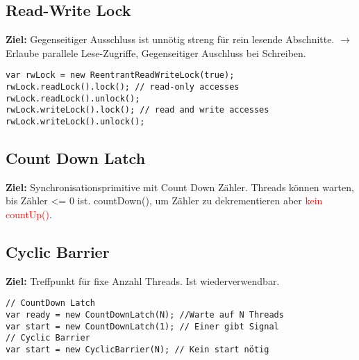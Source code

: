 \subsection{Read-Write Lock}
\textcolor{b}{\textbf{Ziel:}} Gegenseitiger Ausschluss ist unnötig streng für rein
lesende Abschnitte. $\rightarrow$ Erlaube parallele Lese-Zugriffe, Gegenseitiger Auschluss bei Schreiben.
\begin{lstlisting}
var rwLock = new ReentrantReadWriteLock(true);
rwLock.readLock().lock(); // read-only accesses
rwLock.readLock().unlock();
rwLock.writeLock().lock(); // read and write accesses
rwLock.writeLock().unlock();
\end{lstlisting}
\subsection{Count Down Latch}
\textcolor{b}{\textbf{Ziel:}} Synchronisationsprimitive mit Count Down Zähler. Threads können warten, bis Zähler <= 0 ist. \textcolor{b}{countDown()}, um Zähler zu dekrementieren aber \textcolor{red}{kein countUp()}.
\subsection{Cyclic Barrier}
\textcolor{b}{\textbf{Ziel:}} Treffpunkt für fixe Anzahl Threads. Ist wiederverwendbar.
\begin{lstlisting}
// CountDown Latch
var ready = new CountDownLatch(N); //Warte auf N Threads
var start = new CountDownLatch(1); // Einer gibt Signal
// Cyclic Barrier
var start = new CyclicBarrier(N); // Kein start nötig
\end{lstlisting}